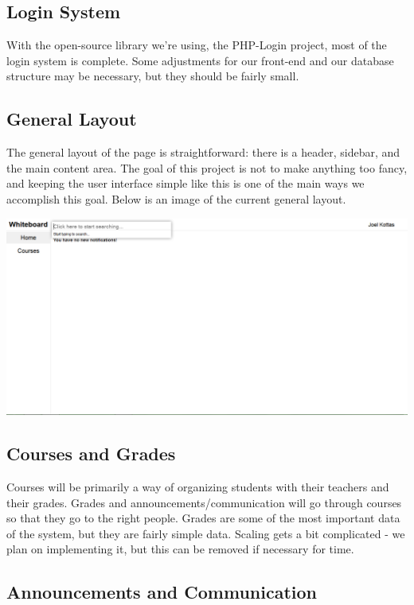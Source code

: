 \documentclass{article}
\begin{document}
\subsection{Login System}

With the open-source library we're using, the PHP-Login project, most of the
login system is complete. Some adjustments for our front-end and our database
structure may be necessary, but they should be fairly small.

\subsection{General Layout}

The general layout of the page is straightforward: there is a header, sidebar,
and the main content area. The goal of this project is not to make anything too
fancy, and keeping the user interface simple like this is one of the main ways
we accomplish this goal. Below is an image of the current general layout.

\includegraphics[width=6.5 in]{general_layout}

\subsection{Courses and Grades}

Courses will be primarily a way of organizing students with their teachers and
their grades. Grades and announcements/communication will go through courses so
that they go to the right people. Grades are some of the most important data of
the system, but they are fairly simple data. Scaling gets a bit complicated -
we plan on implementing it, but this can be removed if necessary for time.

\subsection{Announcements and Communication}
\end{document}
